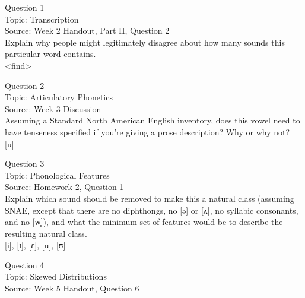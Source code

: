 \documentclass[12pt]{article}
\begin{document}
\begin{center}
\textbf{{\color{blue}{\HUGE START OF EXAM\\}}}

\textbf{{\color{blue}{\HUGE Student ID: 53176\\}}}

\textbf{{\color{blue}{\HUGE \\}}}

\end{center}
\newpage

{\large Question 1}\\

Topic: Transcription\\
Source: Week 2 Handout, Part II, Question 2\\

Explain why people might legitimately disagree about how many sounds this particular word contains.\\

<find>


\newpage

{\large Question 2}\\

Topic: Articulatory Phonetics\\
Source: Week 3 Discussion\\

Assuming a Standard North American English inventory, does this vowel need to have tenseness specified if you're giving a prose description? Why or why not?\\

{[u]}


\newpage

{\large Question 3}\\

Topic: Phonological Features\\
Source: Homework 2, Question 1\\

Explain which sound should be removed to make this a natural class (assuming SNAE, except that there are no diphthongs, no [ə] or [ʌ], no syllabic consonants, and no [w̥]), and what the minimum set of features would be to describe the resulting natural class.\\

{[i]}, {[ɪ]}, {[ɛ]}, {[u]}, {[ʊ]}


\newpage

{\large Question 4}\\

Topic: Skewed Distributions\\
Source: Week 5 Handout, Question 6\\
\end{document}
